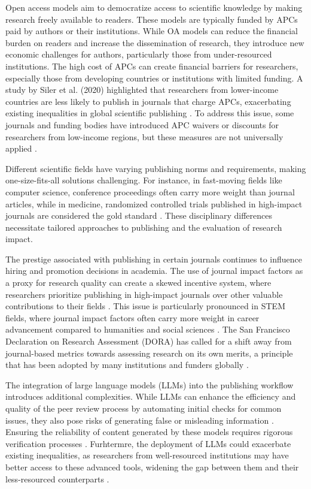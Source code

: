 \documentclass{article}
\begin{document}
Open access models aim to democratize access to scientific knowledge by making research freely available to readers. These models are typically funded by APCs paid by authors or their institutions. While OA models can reduce the financial burden on readers and increase the dissemination of research, they introduce new economic challenges for authors, particularly those from under-resourced institutions. The high cost of APCs can create financial barriers for researchers, especially those from developing countries or institutions with limited funding. A study by Siler et al. (2020) highlighted that researchers from lower-income countries are less likely to publish in journals that charge APCs, exacerbating existing inequalities in global scientific publishing \cite{siler2020authorial}. To address this issue, some journals and funding bodies have introduced APC waivers or discounts for researchers from low-income regions, but these measures are not universally applied \cite{khoo2019apc}.

Different scientific fields have varying publishing norms and requirements, making one-size-fits-all solutions challenging. For instance, in fast-moving fields like computer science, conference proceedings often carry more weight than journal articles, while in medicine, randomized controlled trials published in high-impact journals are considered the gold standard \cite{hyland2016academic}. These disciplinary differences necessitate tailored approaches to publishing and the evaluation of research impact.

The prestige associated with publishing in certain journals continues to influence hiring and promotion decisions in academia. The use of journal impact factors as a proxy for research quality can create a skewed incentive system, where researchers prioritize publishing in high-impact journals over other valuable contributions to their fields \cite{mckiernan2019use}. This issue is particularly pronounced in STEM fields, where journal impact factors often carry more weight in career advancement compared to humanities and social sciences \cite{alperin2022significant}. The San Francisco Declaration on Research Assessment (DORA) has called for a shift away from journal-based metrics towards assessing research on its own merits, a principle that has been adopted by many institutions and funders globally \cite{dora2012sfdora}.

The integration of large language models (LLMs) into the publishing workflow introduces additional complexities. While LLMs can enhance the efficiency and quality of the peer review process by automating initial checks for common issues, they also pose risks of generating false or misleading information \cite{heaven2018ai}. Ensuring the reliability of content generated by these models requires rigorous verification processes \cite{bender2021dangers}. Furhtermre, the deployment of LLMs could exacerbate existing inequalities, as researchers from well-resourced institutions may have better access to these advanced tools, widening the gap between them and their less-resourced counterparts \cite{leins2020gpt3}.
 
\end{document}
